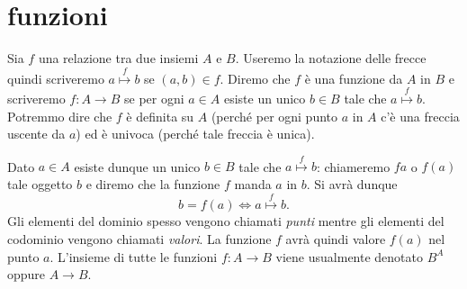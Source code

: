 \section{funzioni}

Sia $f$ una relazione tra due insiemi $A$ e $B$. 
Useremo la notazione delle frecce quindi scriveremo $a\stackrel f\mapsto b$ 
se $(a,b)\in f$. 
Diremo che $f$ è una funzione da $A$ in $B$ e scriveremo 
$f\colon A\to B$ se per ogni $a\in A$ esiste un unico $b\in B$ 
tale che $a \stackrel f \mapsto b$.
Potremmo dire che $f$ è definita su $A$ 
(perché per ogni punto $a$ in $A$ c'è una freccia uscente da $a$)
ed è univoca (perché tale freccia è unica).

Dato $a\in A$ esiste dunque un unico $b\in B$ tale che
$a\stackrel f \mapsto b$: chiameremo $fa$
o $f(a)$ 
%
tale oggetto $b$
e diremo che la funzione $f$ manda $a$ in $b$. 
Si avrà dunque
\[
 b=f(a) \iff a\stackrel f \mapsto b.
\]
Gli elementi del dominio spesso vengono chiamati \emph{punti}
mentre gli elementi del codominio vengono 
chiamati \emph{valori}. 
La funzione $f$ avrà quindi valore $f(a)$ nel punto $a$.
L'insieme di tutte le funzioni $f\colon A\to B$ viene usualmente denotato $B^A$
oppure $A\to B$.
%
%
%
%

